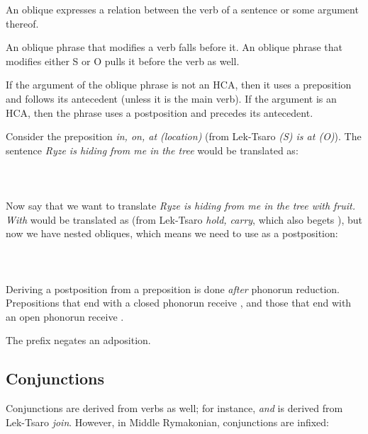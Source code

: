 \documentclass{book}
\newcommand{\lname}{Middle Rymakonian}
\begin{document}
An oblique expresses a relation between the verb of a sentence or some argument thereof.

An oblique phrase that modifies a verb falls before it. An oblique phrase that modifies either S or O pulls it before the verb as well.

If the argument of the oblique phrase is not an HCA, then it uses a preposition and follows its antecedent (unless it is the main verb). If the argument is an HCA, then the phrase uses a postposition and precedes its antecedent.

Consider the preposition  \emph{in, on, at (location)} (from Lek-Tsaro  \emph{(S) is at (O)}). The sentence \emph{Ryze is hiding from me in the tree} would be translated as: \\
~\\
 \\
     \\

Now say that we want to translate \emph{Ryze is hiding from me in the tree with fruit.} \emph{With} would be translated as  (from Lek-Tsaro  \emph{hold, carry}, which also begets ), but now we have nested obliques, which means we need to use  as a postposition: \\
~\\
 \\
       \\

Deriving a postposition from a preposition is done \emph{after} phonorun reduction. Prepositions that end with a closed phonorun receive , and those that end with an open phonorun receive .

The prefix  negates an adposition.

\subsection{Conjunctions}

Conjunctions are derived from verbs as well; for instance,  \emph{and} is derived from Lek-Tsaro  \emph{join}. However, in \lname{}, conjunctions are infixed: \\
~\\
 \\
 \\
     \\
\end{document}
